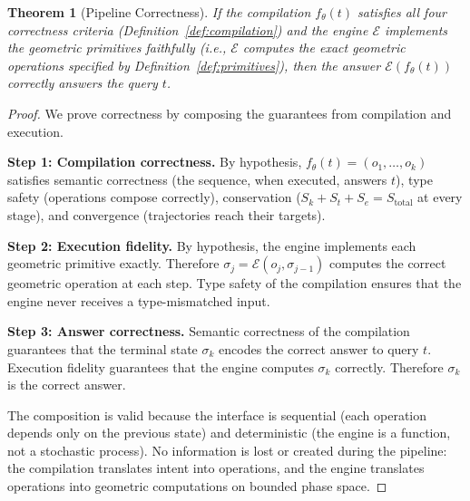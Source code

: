 \documentclass[11pt,twocolumn,a4paper]{article}
\newtheorem{theorem}{Theorem}[section]
\theoremstyle{definition}
\theoremstyle{remark}
\newcommand{\Sk}{S_k}
\newcommand{\St}{S_t}
\newcommand{\Se}{S_e}
\newcommand{\params}{\theta}
\newcommand{\engine}{\mathcal{E}}
\begin{document}
\begin{theorem}[Pipeline Correctness]
\label{thm:pipeline_correctness}
If the compilation $f_\params(t)$ satisfies all four correctness criteria (Definition~\ref{def:compilation}) and the engine $\engine$ implements the geometric primitives faithfully (i.e., $\engine$ computes the exact geometric operations specified by Definition~\ref{def:primitives}), then the answer $\engine(f_\params(t))$ correctly answers the query $t$.
\end{theorem}

\begin{proof}
We prove correctness by composing the guarantees from compilation and execution.

\textbf{Step 1: Compilation correctness.} By hypothesis, $f_\params(t) = (o_1, \ldots, o_k)$ satisfies semantic correctness (the sequence, when executed, answers $t$), type safety (operations compose correctly), conservation ($\Sk + \St + \Se = S_{\mathrm{total}}$ at every stage), and convergence (trajectories reach their targets).

\textbf{Step 2: Execution fidelity.} By hypothesis, the engine implements each geometric primitive exactly. Therefore $\sigma_j = \engine(o_j, \sigma_{j-1})$ computes the correct geometric operation at each step. Type safety of the compilation ensures that the engine never receives a type-mismatched input.

\textbf{Step 3: Answer correctness.} Semantic correctness of the compilation guarantees that the terminal state $\sigma_k$ encodes the correct answer to query $t$. Execution fidelity guarantees that the engine computes $\sigma_k$ correctly. Therefore $\sigma_k$ is the correct answer.

The composition is valid because the interface is sequential (each operation depends only on the previous state) and deterministic (the engine is a function, not a stochastic process). No information is lost or created during the pipeline: the compilation translates intent into operations, and the engine translates operations into geometric computations on bounded phase space.
\end{proof}
\end{document}
